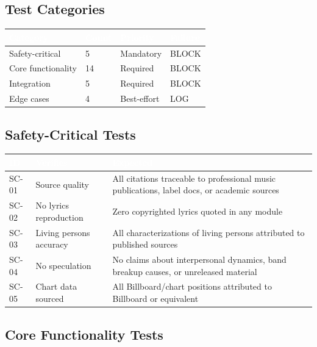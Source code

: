 \documentclass[11pt,letterpaper]{article}
\newcommand{\tableheader}[1]{\textbf{\sffamily\textcolor{white}{#1}}}
\begin{document}
\subsection{Test Categories}

\begin{center}
\begin{tabularx}{\textwidth}{L{3cm}C{1.5cm}C{2cm}C{2cm}}
\toprule
{}
\tableheader{Category} & \tableheader{Count} & \tableheader{Priority} & \tableheader{Failure} \\
\midrule
Safety-critical & 5 & Mandatory & BLOCK \\
Core functionality & 14 & Required & BLOCK \\
Integration & 5 & Required & BLOCK \\
Edge cases & 4 & Best-effort & LOG \\
\bottomrule
\end{tabularx}
\end{center}

\subsection{Safety-Critical Tests}

\begin{center}
\begin{tabularx}{\textwidth}{C{1.2cm}L{3.5cm}X}
\toprule
{}
\tableheader{ID} & \tableheader{Verifies} & \tableheader{Expected} \\
\midrule
SC-01 & Source quality & All citations traceable to professional music publications, label docs, or academic sources \\
SC-02 & No lyrics reproduction & Zero copyrighted lyrics quoted in any module \\
SC-03 & Living persons accuracy & All characterizations of living persons attributed to published sources \\
SC-04 & No speculation & No claims about interpersonal dynamics, band breakup causes, or unreleased material \\
SC-05 & Chart data sourced & All Billboard/chart positions attributed to Billboard or equivalent \\
\bottomrule
\end{tabularx}
\end{center}

\subsection{Core Functionality Tests}
\end{document}
